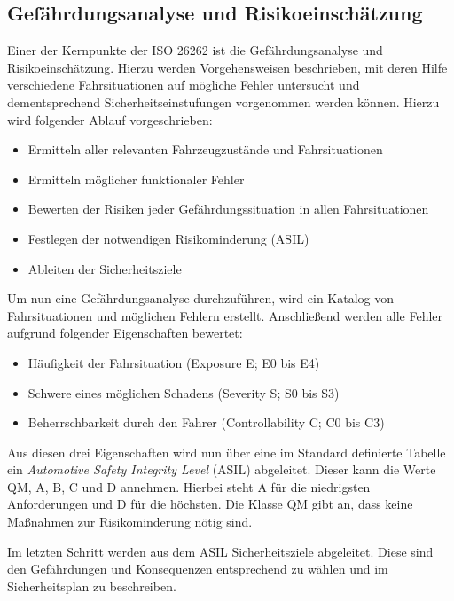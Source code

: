 \documentclass[
  a4paper,					    %
  twoside,
  DIV=calc,     				%
  bibliography=totoc,
  cleardoublepage=empty,
  ngerman,     					%
  final       					%
]{scrbook}
\begin{document}
\subsection{Gefährdungsanalyse und Risikoeinschätzung}
\label{sec:ISO26262_GundR}
Einer der Kernpunkte der ISO 26262 ist die Gefährdungsanalyse und Risikoeinschätzung. Hierzu werden Vorgehensweisen beschrieben, mit deren Hilfe verschiedene Fahrsituationen auf mögliche Fehler untersucht und dementsprechend Sicherheitseinstufungen vorgenommen werden können. Hierzu wird folgender Ablauf vorgeschrieben:

\begin{itemize}
    \item Ermitteln aller relevanten Fahrzeugzustände und Fahrsituationen
    \item Ermitteln möglicher funktionaler Fehler
    \item Bewerten der Risiken jeder Gefährdungssituation in allen Fahrsituationen
    \item Festlegen der notwendigen Risikominderung (ASIL)
    \item Ableiten der Sicherheitsziele
\end{itemize}

Um nun eine Gefährdungsanalyse durchzuführen, wird ein Katalog von Fahrsituationen und möglichen Fehlern erstellt. Anschließend werden alle Fehler aufgrund folgender Eigenschaften bewertet:

\begin{itemize}
    \item Häufigkeit der Fahrsituation (Exposure E; E0 bis E4)
    \item Schwere eines möglichen Schadens (Severity S; S0 bis S3)
    \item Beherrschbarkeit durch den Fahrer (Controllability C; C0 bis C3)
\end{itemize}

Aus diesen drei Eigenschaften wird nun über eine im Standard definierte Tabelle ein \emph{Automotive Safety Integrity Level} (ASIL) abgeleitet. Dieser kann die Werte QM, A, B, C und D annehmen. Hierbei steht A für die niedrigsten Anforderungen und D für die höchsten. Die Klasse QM gibt an, dass keine Maßnahmen zur Risikominderung nötig sind.

Im letzten Schritt werden aus dem ASIL Sicherheitsziele abgeleitet. Diese sind den Gefährdungen und Konsequenzen entsprechend zu wählen und im Sicherheitsplan zu beschreiben.
\end{document}
